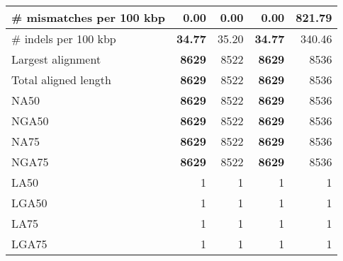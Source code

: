 \documentclass[12pt,a4paper]{article}
\begin{document}
\begin{table}[ht]
\begin{center}
\begin{tabular}{|l*{4}{|r}|}
\# mismatches per 100 kbp & {\bf 0.00} & {\bf 0.00} & {\bf 0.00} & 821.79 \\ \hline
\# indels per 100 kbp & {\bf 34.77} & 35.20 & {\bf 34.77} & 340.46 \\ \hline
Largest alignment & {\bf 8629} & 8522 & {\bf 8629} & 8536 \\ \hline
Total aligned length & {\bf 8629} & 8522 & {\bf 8629} & 8536 \\ \hline
NA50 & {\bf 8629} & 8522 & {\bf 8629} & 8536 \\ \hline
NGA50 & {\bf 8629} & 8522 & {\bf 8629} & 8536 \\ \hline
NA75 & {\bf 8629} & 8522 & {\bf 8629} & 8536 \\ \hline
NGA75 & {\bf 8629} & 8522 & {\bf 8629} & 8536 \\ \hline
LA50 & 1 & 1 & 1 & 1 \\ \hline
LGA50 & 1 & 1 & 1 & 1 \\ \hline
LA75 & 1 & 1 & 1 & 1 \\ \hline
LGA75 & 1 & 1 & 1 & 1 \\ \hline
\end{tabular}
\end{center}
\end{table}
\end{document}
